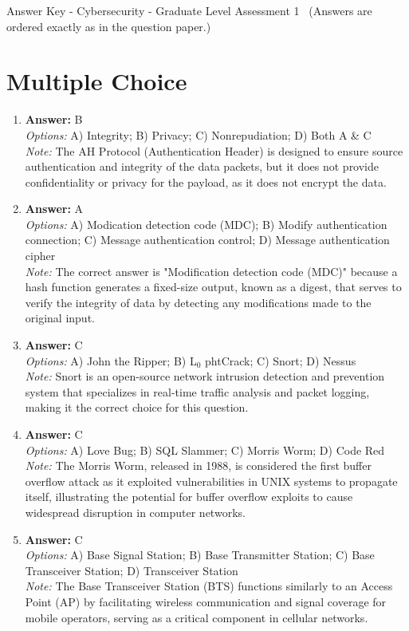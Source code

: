 \documentclass[12pt]{article}
\begin{document}
\begin{center}
Answer Key - Cybersecurity - Graduate Level Assessment 1 \
\small (Answers are ordered exactly as in the question paper.)
\end{center}

\section*{Multiple Choice}
\begin{enumerate}[label=\arabic*.]
\item \textbf{Answer:} B
\\ \textit{Options:} A) Integrity; B) Privacy; C) Nonrepudiation; D) Both A \& C
\\ \textit{Note:} The AH Protocol (Authentication Header) is designed to ensure source authentication and integrity of the data packets, but it does not provide confidentiality or privacy for the payload, as it does not encrypt the data.
\item \textbf{Answer:} A
\\ \textit{Options:} A) Modication detection code (MDC); B) Modify authentication connection; C) Message authentication control; D) Message authentication cipher
\\ \textit{Note:} The correct answer is "Modification detection code (MDC)" because a hash function generates a fixed-size output, known as a digest, that serves to verify the integrity of data by detecting any modifications made to the original input.
\item \textbf{Answer:} C
\\ \textit{Options:} A) John the Ripper; B) L$_{0}$ phtCrack; C) Snort; D) Nessus
\\ \textit{Note:} Snort is an open-source network intrusion detection and prevention system that specializes in real-time traffic analysis and packet logging, making it the correct choice for this question.
\item \textbf{Answer:} C
\\ \textit{Options:} A) Love Bug; B) SQL Slammer; C) Morris Worm; D) Code Red
\\ \textit{Note:} The Morris Worm, released in 1988, is considered the first buffer overflow attack as it exploited vulnerabilities in UNIX systems to propagate itself, illustrating the potential for buffer overflow exploits to cause widespread disruption in computer networks.
\item \textbf{Answer:} C
\\ \textit{Options:} A) Base Signal Station; B) Base Transmitter Station; C) Base Transceiver Station; D) Transceiver Station
\\ \textit{Note:} The Base Transceiver Station (BTS) functions similarly to an Access Point (AP) by facilitating wireless communication and signal coverage for mobile operators, serving as a critical component in cellular networks.
\end{enumerate}
\end{document}
